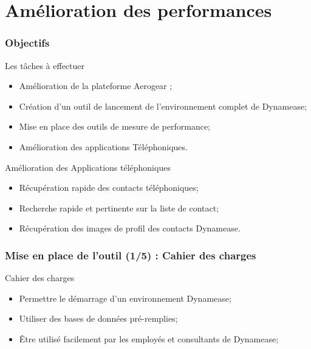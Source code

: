 \section{Amélioration des performances}
\author{Kévin Moreau}


\begin{frame}
	\frametitle{Objectifs}

	\begin{block}{Les tâches à effectuer}
	 \begin{itemize}
      \item Amélioration de la plateforme Aerogear ;
	  \item Création d'un outil de lancement de l'environnement complet de Dynamease;
	  \item Mise en place des outils de mesure de performance;
	  \item Amélioration des applications Téléphoniques.
	 \end{itemize}
	\end{block}

	\begin{block}{Amélioration des Applications téléphoniques}
		\begin{itemize}
			\item Récupération rapide des contacts téléphoniques;
			\item Recherche rapide et pertinente sur la liste de contact;
			\item Récupération des images de profil des contacts Dynamease.
		\end{itemize}
	\end{block}

    
\end{frame}

\begin{frame}
	\frametitle{Mise en place de l'outil (1/5) : Cahier des charges}

    \begin{block}{Cahier des charges}
	 \begin{itemize}
	  \item Permettre le démarrage d'un environnement Dynamease;
	  \item Utiliser des bases de données pré-remplies;
	  \item Être utilisé facilement par les employés et consultants de Dynamease;
	 \end{itemize}
	\end{block}

\end{frame}

